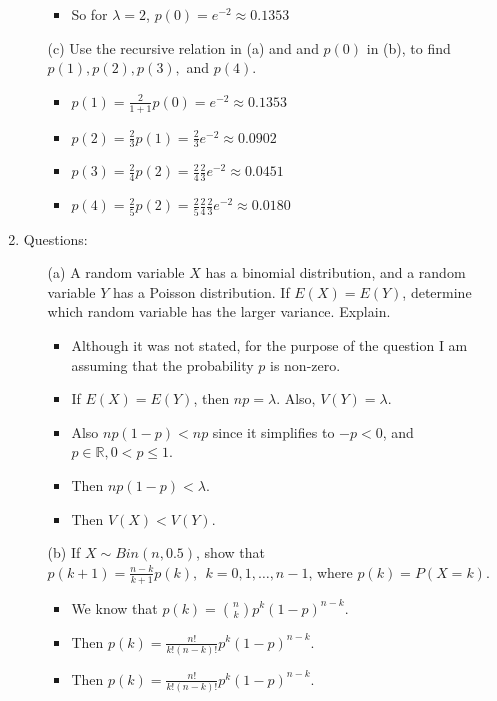 \documentclass{article}
\begin{document}
\begin{enumerate}
\begin{itemize}
\begin{itemize}
        \item So for $\lambda=2$, $p(0) = e^{-2} \approx 0.1353$
        \end{itemize}
    \item [(c)] Use the recursive relation in (a) and and $p(0)$ in (b), to find $p(1),p(2),p(3),$ and $p(4)$.
        \begin{itemize}
        \item $p(1) = \frac{2}{1+1}p(0) = e^{-2} \approx 0.1353$
        \item $p(2) = \frac{2}{3}p(1) = \frac{2}{3} e^{-2} \approx 0.0902$
        \item $p(3) = \frac{2}{4}p(2) = \frac{2}{4} \frac{2}{3} e^{-2} \approx 0.0451$
        \item $p(4) = \frac{2}{5}p(2) = \frac{2}{5} \frac{2}{4} \frac{2}{3} e^{-2} \approx 0.0180$
        \end{itemize}
    \end{itemize}
\item Questions:
    \begin{itemize}
    \item [(a)] A random variable $X$ has a binomial distribution, and a random variable $Y$ has a Poisson distribution. If $E(X)=E(Y)$, determine which random variable has the larger variance. Explain.
        \begin{itemize}
        \item Although it was not stated, for the purpose of the question I am assuming that the probability $p$ is non-zero.
        \item If $E(X) = E(Y)$, then $np = \lambda$. Also, $V(Y) = \lambda$.
        \item Also $np(1 - p) < np$ since it simplifies to $-p < 0$, and $p \in \mathbb{R}, 0 < p \leq 1$.
        \item Then $np(1 - p) < \lambda$.
        \item Then $V(X) < V(Y)$.
        \end{itemize}
    \item [(b)] If $X\sim Bin(n,0.5)$, show that $p(k+1)=\frac{n-k}{k+1}p(k),\ \ k=0,1,\ldots, n-1$, where $p(k)=P(X=k)$.
        \begin{itemize}
        \item We know that $p(k) = \binom{n}{k} p^k (1 - p)^{n-k}$.
        \item Then $p(k) = \frac{n!}{k!(n-k)!} p^k (1 - p)^{n-k}$.
        \item Then $p(k) = \frac{n!}{k!(n-k)!} p^k (1 - p)^{n-k}$.

\end{itemize}
\end{itemize}
\end{enumerate}
\end{document}
